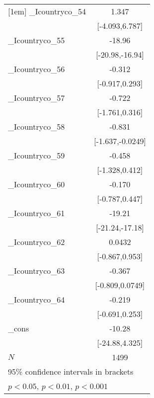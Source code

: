 {\begin{tabular}{l*{1}{c}}
[1em]
\_Icountryco\_54&                 1.347         \\
            &        [-4.093,6.787]         \\
[1em]
\_Icountryco\_55&                -18.96\sym{***}\\
            &       [-20.98,-16.94]         \\
[1em]
\_Icountryco\_56&                -0.312         \\
            &        [-0.917,0.293]         \\
[1em]
\_Icountryco\_57&                -0.722         \\
            &        [-1.761,0.316]         \\
[1em]
\_Icountryco\_58&                -0.831\sym{*}  \\
            &      [-1.637,-0.0249]         \\
[1em]
\_Icountryco\_59&                -0.458         \\
            &        [-1.328,0.412]         \\
[1em]
\_Icountryco\_60&                -0.170         \\
            &        [-0.787,0.447]         \\
[1em]
\_Icountryco\_61&                -19.21\sym{***}\\
            &       [-21.24,-17.18]         \\
[1em]
\_Icountryco\_62&                0.0432         \\
            &        [-0.867,0.953]         \\
[1em]
\_Icountryco\_63&                -0.367         \\
            &       [-0.809,0.0749]         \\
[1em]
\_Icountryco\_64&                -0.219         \\
            &        [-0.691,0.253]         \\
[1em]
\_cons      &                -10.28         \\
            &        [-24.88,4.325]         \\
\hline
\(N\)       &                  1499         \\
\hline\hline
\multicolumn{2}{l}{\footnotesize 95\% confidence intervals in brackets}\\
\multicolumn{2}{l}{\footnotesize \sym{*} \(p<0.05\), \sym{**} \(p<0.01\), \sym{***} \(p<0.001\)}\\
\end{tabular}
}
